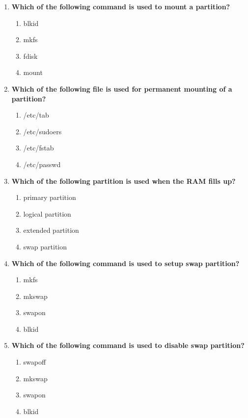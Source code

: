 \begin{flushleft}
\begin{enumerate}
		\item \textbf{Which of the following command is used to mount a partition?}
		\begin{enumerate}[label=(\alph*)]
			\item blkid  
			\item mkfs  
			\item fdisk
			\item mount   %
		\end{enumerate}
		\bigskip
		\bigskip	

		\item \textbf{Which of the following file is used for permanent mounting of a partition?}
		\begin{enumerate}[label=(\alph*)]
			\item /etc/tab
			\item /etc/sudoers
			\item /etc/fstab   %
			\item /etc/passwd 
		\end{enumerate}
		\bigskip
		\bigskip	

		\item \textbf{Which of the following partition is used when the RAM fills up?}
			\begin{enumerate}[label=(\alph*)]
				\item primary partition
				\item logical partition  
				\item extended partition 
				\item swap partition   %
			\end{enumerate}
			\bigskip
			\bigskip

		\item \textbf{Which of the following command is used to setup swap partition?}
		\begin{enumerate}[label=(\alph*)]
			\item mkfs
			\item mkswap   %
			\item swapon   %
			\item blkid
		\end{enumerate}
		\bigskip
		\bigskip

		\item \textbf{Which of the following command is used to disable swap partition?}
		\begin{enumerate}[label=(\alph*)]
			\item swapoff  %
			\item mkswap   
			\item swapon   
			\item blkid
		\end{enumerate}
		\bigskip
		\bigskip
		
	\end{enumerate}
	
	
\end{flushleft}

